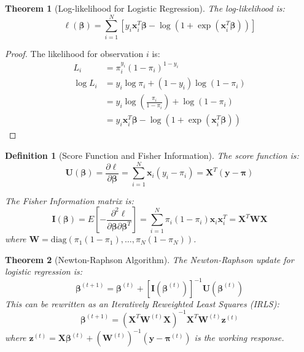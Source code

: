\documentclass{article}
\newtheorem{definition}{Definition}
\newtheorem{theorem}{Theorem}
\begin{document}
\begin{theorem}[Log-likelihood for Logistic Regression]
The log-likelihood is:
\begin{equation}
\ell(\boldsymbol{\beta}) = \sum_{i=1}^N \left[y_i\mathbf{x}_i^T\boldsymbol{\beta} - \log(1 + \exp(\mathbf{x}_i^T\boldsymbol{\beta}))\right]
\end{equation}
\end{theorem}

\begin{proof}
The likelihood for observation $i$ is:
\begin{align}
L_i &= \pi_i^{y_i}(1-\pi_i)^{1-y_i} \\
\log L_i &= y_i\log\pi_i + (1-y_i)\log(1-\pi_i) \\
&= y_i\log\left(\frac{\pi_i}{1-\pi_i}\right) + \log(1-\pi_i) \\
&= y_i\mathbf{x}_i^T\boldsymbol{\beta} - \log(1 + \exp(\mathbf{x}_i^T\boldsymbol{\beta}))
\end{align}
\end{proof}

\begin{definition}[Score Function and Fisher Information]
The score function is:
\begin{equation}
\mathbf{U}(\boldsymbol{\beta}) = \frac{\partial \ell}{\partial \boldsymbol{\beta}} = \sum_{i=1}^N \mathbf{x}_i(y_i - \pi_i) = \mathbf{X}^T(\mathbf{y} - \boldsymbol{\pi})
\end{equation}

The Fisher Information matrix is:
\begin{equation}
\mathbf{I}(\boldsymbol{\beta}) = E\left[-\frac{\partial^2 \ell}{\partial \boldsymbol{\beta}\partial \boldsymbol{\beta}^T}\right] = \sum_{i=1}^N \pi_i(1-\pi_i)\mathbf{x}_i\mathbf{x}_i^T = \mathbf{X}^T\mathbf{W}\mathbf{X}
\end{equation}
where $\mathbf{W} = \text{diag}(\pi_1(1-\pi_1), \ldots, \pi_N(1-\pi_N))$.
\end{definition}

\begin{theorem}[Newton-Raphson Algorithm]
The Newton-Raphson update for logistic regression is:
\begin{equation}
\boldsymbol{\beta}^{(t+1)} = \boldsymbol{\beta}^{(t)} + [\mathbf{I}(\boldsymbol{\beta}^{(t)})]^{-1}\mathbf{U}(\boldsymbol{\beta}^{(t)})
\end{equation}
This can be rewritten as an Iteratively Reweighted Least Squares (IRLS):
\begin{equation}
\boldsymbol{\beta}^{(t+1)} = (\mathbf{X}^T\mathbf{W}^{(t)}\mathbf{X})^{-1}\mathbf{X}^T\mathbf{W}^{(t)}\mathbf{z}^{(t)}
\end{equation}
where $\mathbf{z}^{(t)} = \mathbf{X}\boldsymbol{\beta}^{(t)} + (\mathbf{W}^{(t)})^{-1}(\mathbf{y} - \boldsymbol{\pi}^{(t)})$ is the working response.
\end{theorem}
\end{document}
